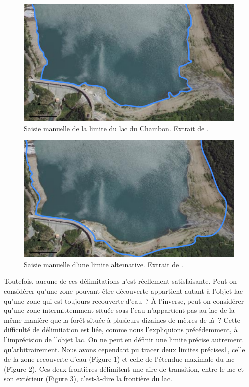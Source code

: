 \begin{figure}
  \centering
  \includegraphics{../figures/fig1.png}
  \caption{Saisie manuelle de la limite du lac du Chambon. Extrait de
    \textcite{Bunel2020}.}
  \label{fig:lim_champ}
\end{figure}

\begin{figure}
  \centering
  \includegraphics{../figures/fig2.png}
  \caption{Saisie manuelle d'une limite alternative. Extrait de
    \textcite{Bunel2020}.}
  \label{fig:lim_champ_alt}
\end{figure}

Toutefois, aucune de ces délimitations n’est réellement
satisfaisante. Peut-on considérer qu’une zone pouvant être découverte
appartient autant à l’objet lac qu’une zone qui est toujours
recouverte d’eau ? À l’inverse, peut-on considérer qu’une zone
intermittemment située sous l’eau n’appartient pas au lac de la même
manière que la forêt située à plusieurs dizaines de mètres de là ?
Cette difficulté de délimitation est liée, comme nous l’expliquions
précédemment, à l’imprécision de l’objet lac. On ne peut en définir
une limite précise autrement qu’arbitrairement. Nous avons cependant
pu tracer deux limites précises1, celle de la zone recouverte d’eau
(Figure 1) et celle de l’étendue maximale du lac (Figure 2). Ces deux
frontières délimitent une aire de transition, entre le lac et son
extérieur (Figure 3), c’est-à-dire la frontière du lac.

